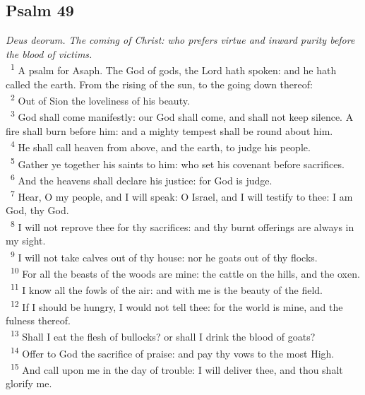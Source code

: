 \documentclass[a5paper,12pt]{article}
\begin{document}
\begin{multicols*}{2}
\section{Psalm 49}
\label{sec:org16a0479}
\emph{Deus deorum. The coming of Christ: who prefers virtue and inward purity before the blood of victims.}\\

~\textsuperscript{1} A psalm for Asaph. The God of gods, the Lord hath spoken: and he hath called the earth. From the rising of the sun, to the going down thereof:\\
~\textsuperscript{2} Out of Sion the loveliness of his beauty.\\
~\textsuperscript{3} God shall come manifestly: our God shall come, and shall not keep silence. A fire shall burn before him: and a mighty tempest shall be round about him.\\
~\textsuperscript{4} He shall call heaven from above, and the earth, to judge his people.\\
~\textsuperscript{5} Gather ye together his saints to him: who set his covenant before sacrifices.\\
~\textsuperscript{6} And the heavens shall declare his justice: for God is judge.\\
~\textsuperscript{7} Hear, O my people, and I will speak: O Israel, and I will testify to thee: I am God, thy God.\\
~\textsuperscript{8} I will not reprove thee for thy sacrifices: and thy burnt offerings are always in my sight.\\
~\textsuperscript{9} I will not take calves out of thy house: nor he goats out of thy flocks.\\
~\textsuperscript{10} For all the beasts of the woods are mine: the cattle on the hills, and the oxen.\\
~\textsuperscript{11} I know all the fowls of the air: and with me is the beauty of the field.\\
~\textsuperscript{12} If I should be hungry, I would not tell thee: for the world is mine, and the fulness thereof.\\
~\textsuperscript{13} Shall I eat the flesh of bullocks? or shall I drink the blood of goats?\\
~\textsuperscript{14} Offer to God the sacrifice of praise: and pay thy vows to the most High.\\
~\textsuperscript{15} And call upon me in the day of trouble: I will deliver thee, and thou shalt glorify me.\\

\end{multicols*}
\end{document}
